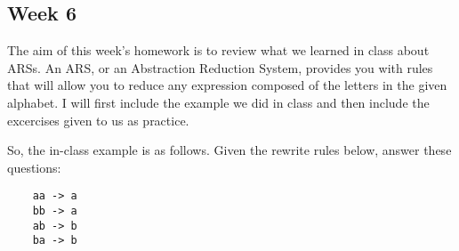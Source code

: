 \documentclass{article}
\theoremstyle{theorem}
\theoremstyle{definition}
\theoremstyle{remark}
\begin{document}
\subsection{Week 6}

The aim of this week's homework is to review what we learned in class about ARSs. An ARS, or an Abstraction Reduction System, provides you with rules that will allow you to reduce any expression composed of the letters in the given alphabet. I will first include the example we 
did in class and then include the excercises given to us as practice. 

So, the in-class example is as follows. Given the rewrite rules below, answer these questions:
\begin{center}
  \begin{verbatim}
    aa -> a 
    bb -> a 
    ab -> b
    ba -> b 
  \end{verbatim}
\end{center}
\end{document}
